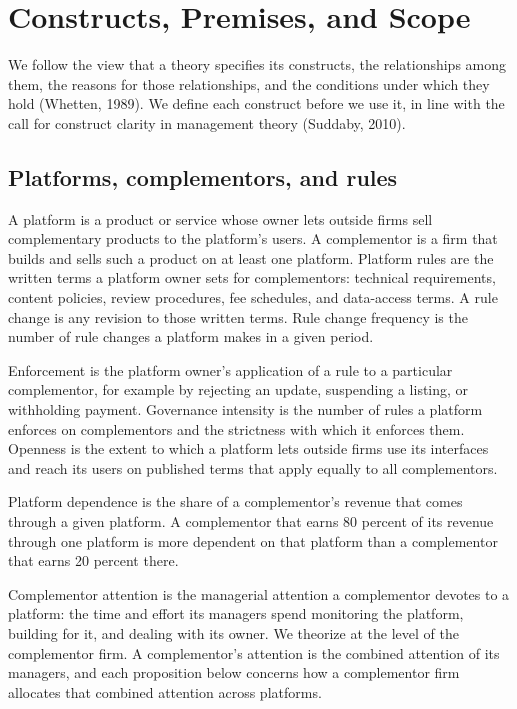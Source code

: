 \documentclass[12pt]{article}
\begin{document}
\section{Constructs, Premises, and Scope}

We follow the view that a theory specifies its constructs, the relationships among them, the reasons for those relationships, and the conditions under which they hold (Whetten, 1989). We define each construct before we use it, in line with the call for construct clarity in management theory (Suddaby, 2010).

\subsection{Platforms, complementors, and rules}

A platform is a product or service whose owner lets outside firms sell complementary products to the platform's users. A complementor is a firm that builds and sells such a product on at least one platform. Platform rules are the written terms a platform owner sets for complementors: technical requirements, content policies, review procedures, fee schedules, and data-access terms. A rule change is any revision to those written terms. Rule change frequency is the number of rule changes a platform makes in a given period.

Enforcement is the platform owner's application of a rule to a particular complementor, for example by rejecting an update, suspending a listing, or withholding payment. Governance intensity is the number of rules a platform enforces on complementors and the strictness with which it enforces them. Openness is the extent to which a platform lets outside firms use its interfaces and reach its users on published terms that apply equally to all complementors.

Platform dependence is the share of a complementor's revenue that comes through a given platform. A complementor that earns 80 percent of its revenue through one platform is more dependent on that platform than a complementor that earns 20 percent there.

Complementor attention is the managerial attention a complementor devotes to a platform: the time and effort its managers spend monitoring the platform, building for it, and dealing with its owner. We theorize at the level of the complementor firm. A complementor's attention is the combined attention of its managers, and each proposition below concerns how a complementor firm allocates that combined attention across platforms.
\end{document}
